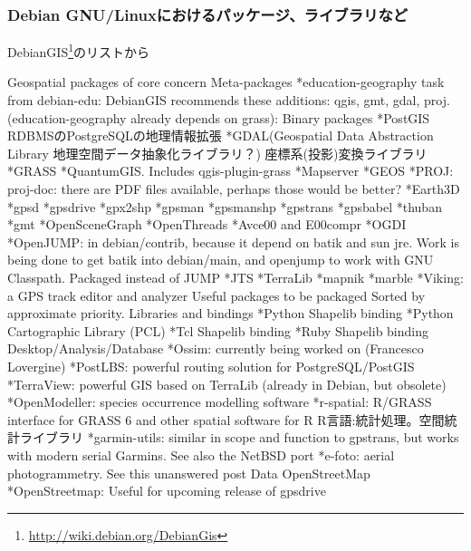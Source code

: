 \documentclass[mingoth,a4paper]{jsarticle}
\begin{document}
\subsubsection{Debian GNU/Linuxにおけるパッケージ、ライブラリなど}

DebianGIS\footnote{\url{http://wiki.debian.org/DebianGis}}のリストから

\begin{commandline}
Geospatial packages of core concern
    Meta-packages
        *education-geography task from debian-edu: DebianGIS recommends these additions: qgis, gmt, gdal, proj.
 (education-geography already depends on grass):
    Binary packages
        *PostGIS
            RDBMSのPostgreSQLの地理情報拡張
        *GDAL(Geospatial Data Abstraction Library 地理空間データ抽象化ライブラリ？)
            座標系(投影)変換ライブラリ
        *GRASS
        *QuantumGIS. Includes qgis-plugin-grass
        *Mapserver
        *GEOS
        *PROJ: proj-doc: there are PDF files available, perhaps those would be better?
        *Earth3D
        *gpsd
        *gpsdrive
        *gpx2shp
        *gpsman
        *gpsmanshp
        *gpstrans
        *gpsbabel
        *thuban
        *gmt
        *OpenSceneGraph
        *OpenThreads
        *Avce00 and E00compr
        *OGDI
        *OpenJUMP: in debian/contrib, because it depend on batik and sun jre. Work is being done to get batik into 
debian/main, and openjump to work with GNU Classpath. Packaged instead of JUMP
        *JTS
        *TerraLib
        *mapnik
        *marble
        *Viking: a GPS track editor and analyzer
        Useful packages to be packaged
        Sorted by approximate priority.
            Libraries and bindings
            *Python Shapelib binding
            *Python Cartographic Library (PCL)
            *Tcl Shapelib binding
            *Ruby Shapelib binding
        Desktop/Analysis/Database
            *Ossim: currently being worked on (Francesco Lovergine)
            *PostLBS: powerful routing solution for PostgreSQL/PostGIS
            *TerraView: powerful GIS based on TerraLib (already in Debian, but obsolete)
            *OpenModeller: species occurrence modelling software
            *r-spatial: R/GRASS interface for GRASS 6 and other spatial software for R
                R言語:統計処理。空間統計ライブラリ
            *garmin-utils: similar in scope and function to gpstrans, but works with modern serial Garmins. 
See also the NetBSD port
            *e-foto: aerial photogrammetry. See this unanswered post
        Data
        OpenStreetMap
            *OpenStreetmap: Useful for upcoming release of gpsdrive

\end{commandline}
\end{document}
